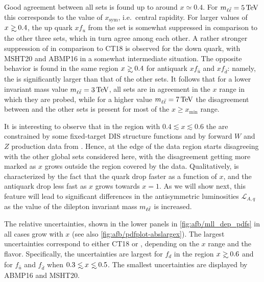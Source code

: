 Good agreement between all \pdf
sets is found up to around $x\simeq 0.4$.
%
For $\mll=\SI{5}{\tera\electronvolt}$ this corresponds to the value of $x_{\text{sym}}$, i.e.\ central rapidity.
%
For larger values of $x\gsim 0.4$, the up  quark \pdf $xf_u$ from the
 set is somewhat
suppressed in comparison to the other three sets, which in turn agree
among each other.
%
A rather stronger suppression of
  in comparison to  CT18 is observed for the down quark, with
MSHT20 and ABMP16 in a somewhat intermediate situation.
%
The opposite behavior is found in the same region $x\gsim 0.4$ for
antiquark \pdfs  $xf_{\bar{u}}$ and $xf_{\bar{d}}$:
namely, the  \pdf is significantly  larger than that of the other sets.
It follows that for a lower invariant mass value  $\mll = \SI{3}{\tera\electronvolt}$, all
\pdf sets are  in agreement in the $x$ range in which they are probed,
while for a higher value  $\mll = \SI{7}{\tera\electronvolt}$ the 
disagreement between  and the other \pdf sets is present for
most of the $x\ge x_{\text{min}}$ range.

It is interesting to observe that in the region with $0.4\lesssim x\lesssim
0.6$ the \pdfs are constrained by some fixed-target DIS structure functions and
by forward $W$ and $Z$ production data from \lhcb.
Hence, at the edge of the data region  starts disagreeing with the
other global \pdf sets considered here, with the disagreement getting more
marked as $x$ grows outside the region covered by the data.
%
Qualitatively,  is characterized by the fact that the
quark \pdfs drop faster as a function of $x$, and the antiquark \pdfs
drop less fast as $x$ grows towards $x=1$.
As we will show next, this feature will lead to significant differences
in the antisymmetric \pdf luminosities $\mathcal{L}_{A,q}$ as the value of
the dilepton invariant mass $m_{\ell\bar{\ell}}$ is increased.

The relative \pdfs uncertainties, shown in the lower panels in
\cref{fig:afb/mll_dep_pdfs} in all cases grow with $x$ (see also 
\cref{fig:afb/pdfplot-abslargex}).
%
The largest \pdf uncertainties correspond to either CT18 or , 
depending on the $x$ range and the \pdf flavor.
%
Specifically, the  uncertainties are largest for $f_d$ in the
region $x\gsim 0.6$ 
and for $f_{\bar{u}}$ and $f_{\bar{d}}$ when $0.3 \lsim x \lsim 0.5$.
%
The smallest \pdf uncertainties are displayed by ABMP16 and  MSHT20.

